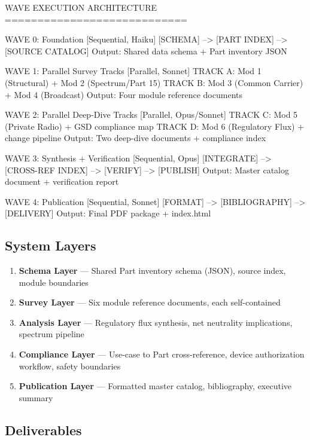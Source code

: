 \documentclass[11pt,letterpaper]{article}
\begin{document}
\begin{asciibox}
WAVE EXECUTION ARCHITECTURE
============================

WAVE 0: Foundation [Sequential, Haiku]
  [SCHEMA] --> [PART INDEX] --> [SOURCE CATALOG]
  Output: Shared data schema + Part inventory JSON

WAVE 1: Parallel Survey Tracks [Parallel, Sonnet]
  TRACK A: Mod 1 (Structural) + Mod 2 (Spectrum/Part 15)
  TRACK B: Mod 3 (Common Carrier) + Mod 4 (Broadcast)
  Output: Four module reference documents

WAVE 2: Parallel Deep-Dive Tracks [Parallel, Opus/Sonnet]
  TRACK C: Mod 5 (Private Radio) + GSD compliance map
  TRACK D: Mod 6 (Regulatory Flux) + change pipeline
  Output: Two deep-dive documents + compliance index

WAVE 3: Synthesis + Verification [Sequential, Opus]
  [INTEGRATE] --> [CROSS-REF INDEX] --> [VERIFY] --> [PUBLISH]
  Output: Master catalog document + verification report

WAVE 4: Publication [Sequential, Sonnet]
  [FORMAT] --> [BIBLIOGRAPHY] --> [DELIVERY]
  Output: Final PDF package + index.html
\end{asciibox}

\subsection{System Layers}

\begin{enumerate}
  \item \textbf{Schema Layer} --- Shared Part inventory schema (JSON), source index, module boundaries
  \item \textbf{Survey Layer} --- Six module reference documents, each self-contained
  \item \textbf{Analysis Layer} --- Regulatory flux synthesis, net neutrality implications, spectrum pipeline
  \item \textbf{Compliance Layer} --- Use-case to Part cross-reference, device authorization workflow, safety boundaries
  \item \textbf{Publication Layer} --- Formatted master catalog, bibliography, executive summary
\end{enumerate}

\subsection{Deliverables}
\end{document}
